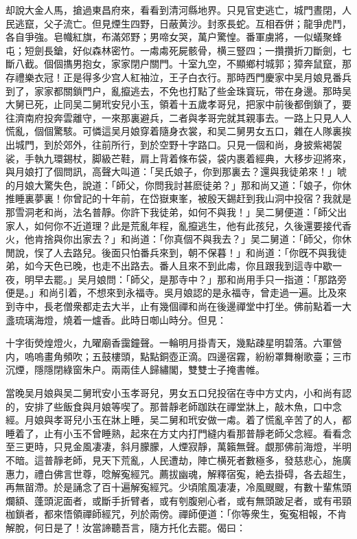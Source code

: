 却說大金人馬，搶過東昌府來，看看到清河縣地界。只見官吏逃亡，城門晝閉，人民逃竄，父子流亡。但見煙生四野，日蔽黄沙。封豕長蛇。互相吞併；龍爭虎鬥，各自爭強。皂幟紅旗，布滿郊野；男啼女哭，萬户驚惶。番軍虜將，一似蟻聚蜂屯；短劍長鎗，好似森林密竹。一䖏䖏死屍骸骨，横三豎四；一攢攢折刀斷劍，七斷八截。個個㩦男抱女，家家閉户關門。十室九空，不顯鄉村城郭；獐奔鼠竄，那存禮樂衣冠！正是得多少宫人紅袖泣，王子白衣行。那時西門慶家中吴月娘見番兵到了，家家都關鎖門户，亂攛逃去，不免也打點了些金珠寳玩，带在身邊。那時吴大舅已死，止同吴二舅玳安兒小玉，領着十五歲孝哥兒，把家中前後都倒鎖了，要往濟南府投奔雲離守，一來那裏避兵，二者與孝哥完就其親事去。一路上只見人人慌亂，個個驚駭。可憐這吴月娘穿着隨身衣裳，和吴二舅男女五口，雜在人隊裏挨出城門，到於郊外，往前所行，到於空野十字路口。只見一個和尚，身披紫褐袈裟，手執九環錫杖，脚級芒鞋，肩上背着條布袋，袋内裹着經典，大移步迎將來，與月娘打了個問訊，高聲大叫道：「吴氏娘子，你到那裏去？還與我徒弟來！」唬的月娘大驚失色，說道：「師父，你問我討甚麽徒弟？」那和尚又道：「娘子，你休推睡裏夢裏！你曾記的十年前，在岱嶽東峯，被殷天錫赶到我山洞中投宿？我就是那雪洞老和尚，法名普靜。你許下我徒弟，如何不與我！」吴二舅便道：「師父出家人，如何你不近道理？此是荒亂年程，亂攛逃生，他有此孩兒，久後還要接代香火，他肯捨與你出家去？」和尚道：「你真個不與我去？」吴二舅道：「師父，你休閒說，悮了人去路兒。後面只怕番兵來到，朝不保暮！」和尚道：「你旣不與我徒弟，如今天色已晚，也走不出路去。番人且來不到此䖏，你且跟我到這寺中歇一夜，明早去罷。」吴月娘問：「師父，是那寺中？」那和尚用手只一指道：「那路旁便是。」和尚引着，不想來到永福寺。吳月娘認的是永福寺，曾走過一遍。比及來到寺中，長老僧衆都走去大半，止有幾個禪和尚在後邊禪堂中打坐。佛前點着一大盞琉璃海燈，燒着一爐香。此時日啣山時分。但見：

\begin{myquote}
十字街熒煌燈火，九曜廟香靄鐘聲。一輪明月掛青天，幾點疎星明碧落。六軍營内，嗚嗚畫角頻吹；五鼓樓頭，點點銅壺正滴。四邊宿霧，紛紛罩舞榭歌臺；三市沉煙，隱隱閉綠窗朱户。兩兩佳人歸繡閣，雙雙士子掩書帷。
\end{myquote}

當晚吴月娘與吴二舅玳安小玉孝哥兒，男女五口兒投宿在寺中方丈内，小和尚有認的，安排了些飯食與月娘等喫了。那普靜老師跏趺在禪堂牀上，敲木魚，口中念經。月娘與孝哥兒小玉在牀上睡，吴二舅和玳安做一䖏。着了慌亂辛苦了的人，都睡着了，止有小玉不曾睡熟，起來在方丈内打門縫内看那普靜老師父念經。看看念至三更時，只見金風凄凄，斜月朦朦，人煙寂靜，萬籟無聲。覷那佛前海燈，半明不暗。這普靜老師，見天下荒亂，人民遭劫，陣亡横死者數極多，發慈悲心，施廣惠力，禮白佛言世尊，唸解寃經咒。薦拔幽魂，解釋宿寃，絶去掛碍，各去超生，再無㽞滯。於是誦念了百十遍解寃經咒。少頃隂風凄凄，冷風颼颼，有數十輩焦頭爛額、蓬頭泥面者，或斷手折臂者，或有刳腹剜心者，或有無頭跛足者，或有弔頸枷鎖者，都來悟領禪師經咒，列於兩傍。禪師便道：「你等衆生，寃寃相報，不肯解脫，何日是了！汝當諦聽吾言，隨方托化去罷。偈曰：

